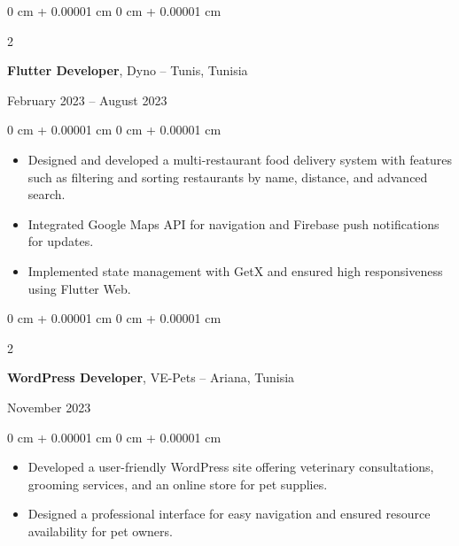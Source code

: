 \documentclass[10pt, letterpaper]{article}
\newenvironment{highlights}{
    \begin{itemize}[
        topsep=0.10 cm,
        parsep=0.10 cm,
        partopsep=0pt,
        itemsep=0pt,
        leftmargin=0 cm + 10pt
    ]
}{
    \end{itemize}
} %
\newenvironment{onecolentry}{
    \begin{adjustwidth}{
        0 cm + 0.00001 cm
    }{
        0 cm + 0.00001 cm
    }
}{
    \end{adjustwidth}
} %
\newenvironment{twocolentry}[2][]{
    \onecolentry
    \def\secondColumn{#2}
    \setcolumnwidth{\fill, 4.5 cm}
    \begin{paracol}{2}
}{
    \switchcolumn \raggedleft \secondColumn
    \end{paracol}
    \endonecolentry
} %
\begin{document}
        \vspace{0.2 cm}
        
        \begin{twocolentry}{
            February 2023 – August 2023
        }
            \textbf{Flutter Developer}, Dyno -- Tunis, Tunisia
        \end{twocolentry}
        
        \vspace{0.10 cm}
        \begin{onecolentry}
            \begin{highlights}
                \item Designed and developed a multi-restaurant food delivery system with features such as filtering and sorting restaurants by name, distance, and advanced search.
                \item Integrated Google Maps API for navigation and Firebase push notifications for updates.
                \item Implemented state management with GetX and ensured high responsiveness using Flutter Web.
            \end{highlights}
        \end{onecolentry}
        
        \vspace{0.2 cm}
        
        \begin{twocolentry}{
            November 2023
        }
            \textbf{WordPress Developer}, VE-Pets -- Ariana, Tunisia
        \end{twocolentry}
        
        \vspace{0.10 cm}
        \begin{onecolentry}
            \begin{highlights}
                \item Developed a user-friendly WordPress site offering veterinary consultations, grooming services, and an online store for pet supplies.
                \item Designed a professional interface for easy navigation and ensured resource availability for pet owners.
            \end{highlights}
        \end{onecolentry}
        
        
            
        
        
        
\end{document}
